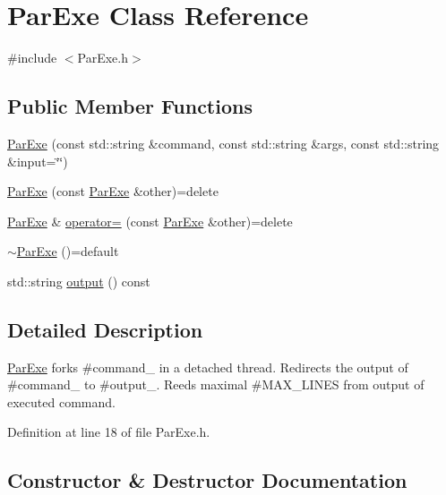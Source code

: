 \hypertarget{class_par_exe}{}\section{Par\+Exe Class Reference}
\label{class_par_exe}


{\ttfamily \#include $<$Par\+Exe.\+h$>$}

\subsection*{Public Member Functions}
\begin{DoxyCompactItemize}
\item 
\hyperlink{class_par_exe_a8cc79409b6f5cdb1bd98d595618e245e}{Par\+Exe} (const std\+::string \&command, const std\+::string \&args, const std\+::string \&input=\char`\"{}\char`\"{})
\item 
\hyperlink{class_par_exe_a78f0aa6a835dbb958fc29abd3457d414}{Par\+Exe} (const \hyperlink{class_par_exe}{Par\+Exe} \&other)=delete
\item 
\hyperlink{class_par_exe}{Par\+Exe} \& \hyperlink{class_par_exe_a200814420e4d2e6f3128c761789d0f1a}{operator=} (const \hyperlink{class_par_exe}{Par\+Exe} \&other)=delete
\item 
\hyperlink{class_par_exe_a6b7cfc33ef1b4afa98ac41a89cff1fd7}{$\sim$\+Par\+Exe} ()=default
\item 
std\+::string \hyperlink{class_par_exe_aa988c933599f973a6641a157331efb1a}{output} () const 
\end{DoxyCompactItemize}


\subsection{Detailed Description}
\hyperlink{class_par_exe}{Par\+Exe} forks \#command\+\_\+ in a detached thread. Redirects the output of \#command\+\_\+ to \#output\+\_\+. Reeds maximal \#\+M\+A\+X\+\_\+\+L\+I\+N\+ES from output of executed command. 

Definition at line 18 of file Par\+Exe.\+h.



\subsection{Constructor \& Destructor Documentation}
